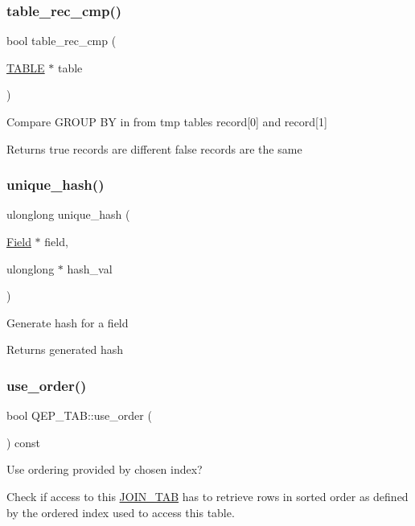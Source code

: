 \subsubsection{\texorpdfstring{table\+\_\+rec\+\_\+cmp()}{table\_rec\_cmp()}}
{\footnotesize\ttfamily bool table\+\_\+rec\+\_\+cmp (\begin{DoxyParamCaption}\item[{\mbox{\hyperlink{structTABLE}{T\+A\+B\+LE}} $\ast$}]{table }\end{DoxyParamCaption})}

Compare G\+R\+O\+UP BY in from tmp table\textquotesingle{}s record\mbox{[}0\mbox{]} and record\mbox{[}1\mbox{]}

\begin{DoxyReturn}{Returns}
true records are different false records are the same 
\end{DoxyReturn}
\mbox{\label{group__Query__Executor_ga161ae3fce537993456b85fe09b4c3d89}} 
\subsubsection{\texorpdfstring{unique\+\_\+hash()}{unique\_hash()}}
{\footnotesize\ttfamily ulonglong unique\+\_\+hash (\begin{DoxyParamCaption}\item[{\mbox{\hyperlink{classField}{Field}} $\ast$}]{field,  }\item[{ulonglong $\ast$}]{hash\+\_\+val }\end{DoxyParamCaption})}

Generate hash for a field

\begin{DoxyReturn}{Returns}
generated hash 
\end{DoxyReturn}
\mbox{\label{group__Query__Executor_ga685838679adf501ece418d4bd969f2ea}} 
\subsubsection{\texorpdfstring{use\+\_\+order()}{use\_order()}}
{\footnotesize\ttfamily bool Q\+E\+P\+\_\+\+T\+A\+B\+::use\+\_\+order (\begin{DoxyParamCaption}{ }\end{DoxyParamCaption}) const}



Use ordering provided by chosen index? 

Check if access to this \mbox{\hyperlink{classJOIN__TAB}{J\+O\+I\+N\+\_\+\+T\+AB}} has to retrieve rows in sorted order as defined by the ordered index used to access this table. 